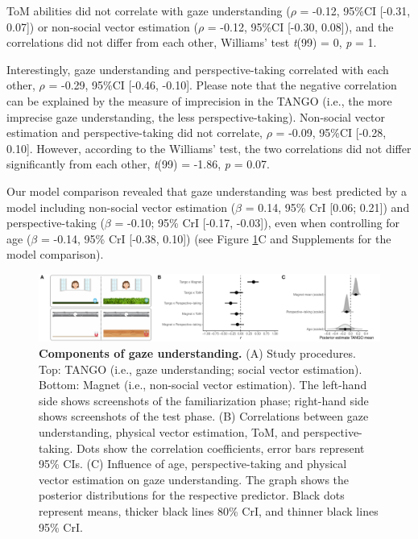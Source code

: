 \documentclass[
  man,mask,floatsintext]{apa7}
\begin{document}
ToM abilities did not correlate with gaze understanding (\(\rho\) = -0.12, 95\%CI {[}-0.31, 0.07{]}) or non-social vector estimation (\(\rho\) = -0.12, 95\%CI {[}-0.30, 0.08{]}), and the correlations did not differ from each other, Williams' test \emph{t}(99) = 0, \emph{p} = 1.

Interestingly, gaze understanding and perspective-taking correlated with each other, \(\rho\) = -0.29, 95\%CI {[}-0.46, -0.10{]}. Please note that the negative correlation can be explained by the measure of imprecision in the TANGO (i.e., the more imprecise gaze understanding, the less perspective-taking). Non-social vector estimation and perspective-taking did not correlate, \(\rho\) = -0.09, 95\%CI {[}-0.28, 0.10{]}. However, according to the Williams' test, the two correlations did not differ significantly from each other, \emph{t}(99) = -1.86, \emph{p} = 0.07.

Our model comparison revealed that gaze understanding was best predicted by a model including non-social vector estimation (\(\beta\) = 0.14, 95\% CrI {[}0.06; 0.21{]}) and perspective-taking (\(\beta\) = -0.10; 95\% CrI {[}-0.17, -0.03{]}), even when controlling for age (\(\beta\) = -0.14, 95\% CrI {[}-0.38, 0.10{]}) (see Figure \ref{fig:fig4}C and Supplements for the model comparison).



\begin{figure}

{\centering \includegraphics[width=1\linewidth]{../figures/magnet_plot} 

}

\caption{\textbf{Components of gaze understanding.} (A) Study procedures. Top: TANGO (i.e., gaze understanding; social vector estimation). Bottom: Magnet (i.e., non-social vector estimation). The left-hand side shows screenshots of the familiarization phase; right-hand side shows screenshots of the test phase. (B) Correlations between gaze understanding, physical vector estimation, ToM, and perspective-taking. Dots show the correlation coefficients, error bars represent 95\% CIs. (C) Influence of age, perspective-taking and physical vector estimation on gaze understanding. The graph shows the posterior distributions for the respective predictor. Black dots represent means, thicker black lines 80\% CrI, and thinner black lines 95\% CrI.}\label{fig:fig4}
\end{figure}
\end{document}
